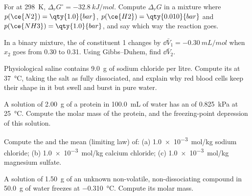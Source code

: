 \begin{exercise}[$\star$]\label{exo:b2:chemical-potential:4}
For  at \qty{298}{K}, $\Delta_r G^\circ =
\qty{-32.8}{kJ/mol}$. Compute $\Delta_r G$ in a mixture where
$p(\ce{N2}) = \qty{1.0}{bar}$, $p(\ce{H2}) = \qty{0.010}{bar}$ and
$p(\ce{NH3}) = \qty{1.0}{bar}$, and say which way the reaction goes.
\end{exercise}

\begin{exercise}[$\star\star$]\label{exo:b2:chemical-potential:5}
In a binary mixture, the  of constituent 1 changes by
$\dd\bar V_1 = \qty{-0.30}{mL/mol}$ when $x_2$ goes from 0.30 to 0.31. Using
Gibbs--Duhem, find $\dd\bar V_2$.
\end{exercise}

\begin{exercise}[$\star\star$]\label{exo:b2:chemical-potential:6}
Physiological saline contains \qty{9.0}{g} of sodium chloride per litre.
Compute its  at \qty{37}{\celsius}, taking the salt as fully
dissociated, and explain why red blood cells keep their shape in it but swell
and burst in pure water.
\end{exercise}

\begin{exercise}[$\star\star$]\label{exo:b2:chemical-potential:7}
A solution of \qty{2.00}{g} of a protein in \qty{100.0}{mL} of water has an
 of \qty{0.825}{kPa} at \qty{25}{\celsius}. Compute the molar
mass of the protein, and the freezing-point depression of this solution.
\end{exercise}

\begin{exercise}[$\star\star$]\label{exo:b2:chemical-potential:8}
Compute the  and the mean  (limiting law)
of: (a) \qty{1.0e-3}{mol/kg} sodium chloride; (b) \qty{1.0e-3}{mol/kg}
calcium chloride; (c) \qty{1.0e-3}{mol/kg} magnesium sulfate.
\end{exercise}

\begin{exercise}[$\star\star$]\label{exo:b2:chemical-potential:9}
A solution of \qty{1.50}{g} of an unknown non-volatile, non-dissociating
compound in \qty{50.0}{g} of water freezes at \qty{-0.310}{\celsius}. Compute
its molar mass.
\end{exercise}

